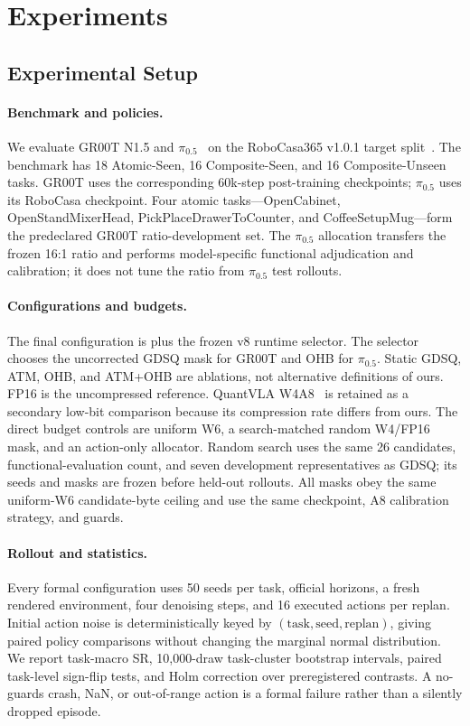 \section{Experiments}
\label{sec:experiments}

\subsection{Experimental Setup}
\label{sec:setup}

\paragraph{Benchmark and policies.}
We evaluate GR00T N1.5 and $\pi_{0.5}$~\cite{intelligence2025pi05} on the RoboCasa365 v1.0.1 target split~\cite{nasiriany2026robocasa365}. The benchmark has 18 Atomic-Seen, 16 Composite-Seen, and 16 Composite-Unseen tasks. GR00T uses the corresponding 60k-step post-training checkpoints; $\pi_{0.5}$ uses its RoboCasa checkpoint. Four atomic tasks---OpenCabinet, OpenStandMixerHead, PickPlaceDrawerToCounter, and CoffeeSetupMug---form the predeclared GR00T ratio-development set. The $\pi_{0.5}$ allocation transfers the frozen 16:1 ratio and performs model-specific functional adjudication and calibration; it does not tune the ratio from $\pi_{0.5}$ test rollouts.

\paragraph{Configurations and budgets.}
The final configuration is \method plus the frozen v8 runtime selector. The selector chooses the uncorrected GDSQ mask for GR00T and OHB for $\pi_{0.5}$. Static GDSQ, ATM, OHB, and ATM+OHB are ablations, not alternative definitions of ours. FP16 is the uncompressed reference. QuantVLA W4A8~\cite{zhang2026quantvla} is retained as a secondary low-bit comparison because its compression rate differs from ours. The direct budget controls are uniform W6, a search-matched random W4/FP16 mask, and an action-only allocator. Random search uses the same 26 candidates, functional-evaluation count, and seven development representatives as GDSQ; its seeds and masks are frozen before held-out rollouts. All masks obey the same uniform-W6 candidate-byte ceiling and use the same checkpoint, A8 calibration strategy, and guards.

\paragraph{Rollout and statistics.}
Every formal configuration uses 50 seeds per task, official horizons, a fresh rendered environment, four denoising steps, and 16 executed actions per replan. Initial action noise is deterministically keyed by $(\text{task},\text{seed},\text{replan})$, giving paired policy comparisons without changing the marginal normal distribution. We report task-macro SR, 10,000-draw task-cluster bootstrap intervals, paired task-level sign-flip tests, and Holm correction over preregistered contrasts. A no-guards crash, NaN, or out-of-range action is a formal failure rather than a silently dropped episode.

